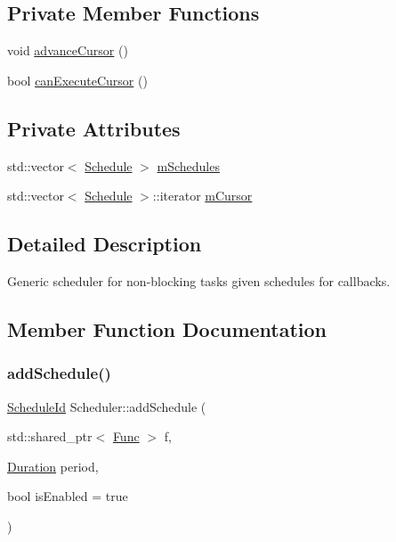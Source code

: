 \subsection*{Private Member Functions}
\begin{DoxyCompactItemize}
\item 
void \mbox{\hyperlink{class_scheduler_ac44493a482b70bbe93a296a910377a2d}{advance\+Cursor}} ()
\item 
bool \mbox{\hyperlink{class_scheduler_a83c09d5b44ccce582ac2b699b1808a0f}{can\+Execute\+Cursor}} ()
\end{DoxyCompactItemize}
\subsection*{Private Attributes}
\begin{DoxyCompactItemize}
\item 
std\+::vector$<$ \mbox{\hyperlink{struct_schedule}{Schedule}} $>$ \mbox{\hyperlink{class_scheduler_a785bcdb6ecc1f238540e554e45aace7c}{m\+Schedules}}
\item 
std\+::vector$<$ \mbox{\hyperlink{struct_schedule}{Schedule}} $>$\+::iterator \mbox{\hyperlink{class_scheduler_a34d96eedc75db87662e70cc2c3ee0263}{m\+Cursor}}
\end{DoxyCompactItemize}


\subsection{Detailed Description}
Generic scheduler for non-\/blocking tasks given schedules for callbacks. 

\subsection{Member Function Documentation}
\mbox{\label{class_scheduler_a28d9d19644657da9902e52f2901fbc15}} 
\subsubsection{\texorpdfstring{add\+Schedule()}{addSchedule()}}
{\footnotesize\ttfamily \mbox{\hyperlink{_scheduler_8h_a1e3b4605bdcbb8f6df7c47013e26e910}{Schedule\+Id}} Scheduler\+::add\+Schedule (\begin{DoxyParamCaption}\item[{std\+::shared\+\_\+ptr$<$ \mbox{\hyperlink{_scheduler_8h_a2125a5a2949d6ee13163b671159c0d4d}{Func}} $>$}]{f,  }\item[{\mbox{\hyperlink{_scheduler_8h_aca1fa1a7edde6bf9e22c7617400fad31}{Duration}}}]{period,  }\item[{bool}]{is\+Enabled = {\ttfamily true} }\end{DoxyParamCaption})}

